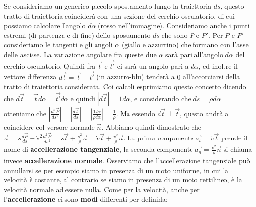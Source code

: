 Se consideriamo un generico piccolo spostamento lungo la traiettoria $ds$, questo tratto di traiettoria coinciderà con una sezione del cerchio osculatorio, di cui possiamo calcolare l'angolo $d\alpha$ (rosso nell'immagine). Consideriamo anche i punti estremi (di partenza e di fine) dello spostamento $ds$ che sono $P$ e $P'$. Per $P$ e $P'$ consideriamo le tangenti e gli angoli $\alpha$ (giallo e azzurrino) che formano con l'asse delle ascisse. La variazione angolare fra queste due $\alpha$ sarà pari all'angolo $d \alpha$ del cerchio osculatorio. Quindi fra $\vec{t}$ e $\vec{t'}$ ci sarà un angolo pari a $d \alpha$, ed inoltre il vettore differenza $d \vec{t} = \vec{t} - \vec{t'}$ (in azzurro-blu) tenderà a $0$ all'accorciarsi della tratto di traiettoria considerata.\newline
\newline
Coi calcoli esprimiamo questo concetto dicendo che $d \vec{t} = \vec{t} d \alpha = \vec{t'} d \alpha$ e quindi $|d \vec{t}| = 1 d \alpha$, e considerando che $ds = \rho d \alpha$ otteniamo che $\left|\frac{d^2 \vec{P}}{ds^2}\right| = \left| \frac{d \vec{t}}{ds} \right| = \left| \frac{1 d \alpha}{\rho d \alpha} \right| = \frac{1}{\rho}$. Ma essendo $d \vec{t} \perp \vec{t}$, questo andrà a coincidere col versore normale $\vec{n}$.\newline
\newline
Abbiamo quindi dimostrato che $\vec{a} = \ddot{s} \frac{d \vec{P}}{ds} + \dot{s}^2 \frac{d^2 \vec{P}}{ ds^2} = \ddot{s} \vec{t} + \frac{ \dot{s}^2}{\rho}\vec{n} = \dot{v} \vec{t} + \frac{v^2}{\rho}\vec{n}$. La prima componente $\vec{a_t} = \dot{v} \vec{t}$ prende il nome di \textbf{accellerazione tangenziale}, la seconda componente $\vec{a_n} = \frac{v^2}{\rho}\vec{n}$ si chiama invece \textbf{accellerazione normale}. Osserviamo che l'accellerazione tangenziale può annullarsi se per esempio siamo in presenza di un moto uniforme, in cui la velocità è costante, al contrario se siamo in presenza di un moto rettilineo, è la velocità normale ad essere nulla.\newline
\newline
Come per la velocità, anche per l'\textbf{accellerazione} ci sono \textbf{modi} differenti per definirla:
